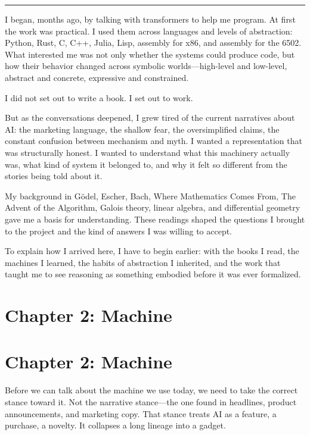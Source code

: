 \documentclass[
]{article}
\begin{document}
\begin{center}\rule{0.5\linewidth}{0.5pt}\end{center}

I began, months ago, by talking with transformers to help me program. At
first the work was practical. I used them across languages and levels of
abstraction: Python, Rust, C, C++, Julia, Lisp, assembly for x86, and
assembly for the 6502. What interested me was not only whether the
systems could produce code, but how their behavior changed across
symbolic worlds---high-level and low-level, abstract and concrete,
expressive and constrained.

I did not set out to write a book. I set out to work.

But as the conversations deepened, I grew tired of the current
narratives about AI: the marketing language, the shallow fear, the
oversimplified claims, the constant confusion between mechanism and
myth. I wanted a representation that was structurally honest. I wanted
to understand what this machinery actually was, what kind of system it
belonged to, and why it felt so different from the stories being told
about it.

My background in Gödel, Escher, Bach, Where Mathematics Comes From, The
Advent of the Algorithm, Galois theory, linear algebra, and differential
geometry gave me a basis for understanding. These readings shaped the
questions I brought to the project and the kind of answers I was willing
to accept.

To explain how I arrived here, I have to begin earlier: with the books I
read, the machines I learned, the habits of abstraction I inherited, and
the work that taught me to see reasoning as something embodied before it
was ever formalized.

\hypertarget{chapter-2-machine}{%
\section{Chapter 2: Machine}\label{chapter-2-machine}}

\hypertarget{chapter-2-machine-1}{%
\section{Chapter 2: Machine}\label{chapter-2-machine-1}}

Before we can talk about the machine we use today, we need to take the
correct stance toward it. Not the narrative stance---the one found in
headlines, product announcements, and marketing copy. That stance treats
AI as a feature, a purchase, a novelty. It collapses a long lineage into
a gadget.
\end{document}
